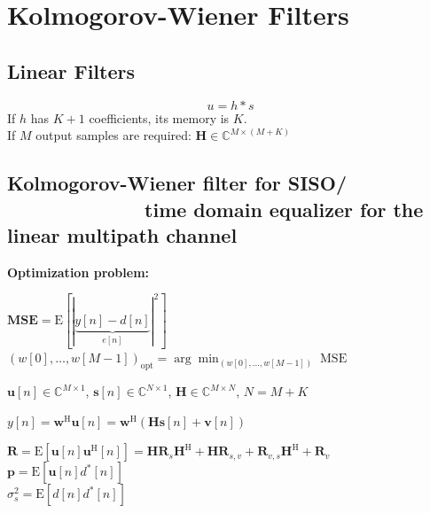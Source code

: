 \documentclass[english]{latex4ei/latex4ei_sheet}
\begin{document}
  \section{Kolmogorov-Wiener Filters}
  \begin{sectionbox}
    \subsection{Linear Filters}
      $$u = h * s$$
      If $h$ has $K+1$ coefficients, its memory is $K$.\\
      If $M$ output samples are required: $\boldsymbol{H} \in \mathbb{C}^{M\times(M+K)}$
  
    \end{sectionbox}

\begin{sectionbox}
  \subsection{Kolmogorov-Wiener filter for SISO/$\quad\quad\quad\quad\quad\quad\quad$ time domain equalizer for the linear multipath channel}

  \textbf{Optimization problem:}
  \begin{emphbox}
    $\mathbf{M S E}=\mathrm{E}[|\underbrace{y[n]-d[n]}_{e[n]}|^{2}]$\\
    $(w[0], \ldots, w[M-1])_{\mathrm{opt}}=\arg \min _{(w[0], \ldots, w[M-1])} \operatorname{MSE}$
  \end{emphbox}
  $\boldsymbol{u}[n] \in \mathbb{C}^{M \times 1}$, $\boldsymbol{s}[n] \in \mathbb{C}^{N \times 1}$, $\boldsymbol{H} \in \mathbb{C}^{M \times N}$, $N=M+K$\\
  \begin{emphbox}
    $y[n]=\boldsymbol{w}^{\mathrm{H}} \boldsymbol{u}[n]=\boldsymbol{w}^{\mathrm{H}}(\boldsymbol{H s}[n]+\boldsymbol{v}[n])$\\
  \end{emphbox}
  $\boldsymbol{R} = \mathrm{E}\left[\boldsymbol{u}[n] \boldsymbol{u}^{\mathrm{H}}[n]\right] = \boldsymbol{H R}_{s} \boldsymbol{H}^{\mathrm{H}}+\boldsymbol{H R}_{s, v}+\boldsymbol{R}_{v, s} \boldsymbol{H}^{\mathrm{H}}+\boldsymbol{R}_{v}$\\
  $\boldsymbol{p} = \mathrm{E}\left[\boldsymbol{u}[n] d^{*}[n]\right]$\\
  $\sigma_{s}^{2} = \mathrm{E}\left[d[n]d^*[n]\right]$ 
  

\end{sectionbox}
\end{document}
